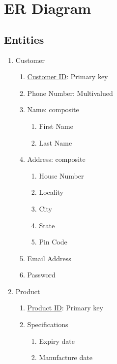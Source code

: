 \documentclass[12pt]{report}
\begin{document}
    \chapter{ER Diagram}
    
    \section{Entities}

    \begin{enumerate}
        \item Customer
            \begin{enumerate}
                \item \underline{Customer ID}: Primary key
                \item Phone Number: Multivalued
                \item Name: composite
                    \begin{enumerate}
                        \item First Name
                        \item Last Name
                    \end{enumerate}
                \item Address: composite
                    \begin{enumerate}
                        \item House Number
                        \item Locality
                        \item City
                        \item State
                        \item Pin Code
                    \end{enumerate}
                \item Email Address
                \item Password
            \end{enumerate}
        \item Product
            \begin{enumerate}
                \item \underline{Product ID}: Primary key
                \item Specifications
                    \begin{enumerate}
                        \item Expiry date
                        \item Manufacture date

\end{enumerate}
\end{enumerate}
\end{enumerate}
\end{document}
